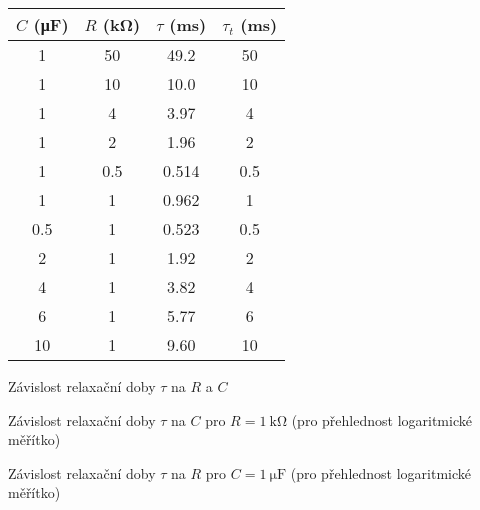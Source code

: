 \begin{tabulka}[htbp]
\centering
\begin{tabular}{c|c|c|c}
$C$ (\si{\micro\farad}) & $R$ (\si{\kilo\ohm}) & $\tau$ (\si{\milli\second}) & $\tau_t$ (\si{\milli\second}) \\ \hline
\num{1} & \num{50} & \num{49.2} & \num{50} \\
\num{1} & \num{10} & \num{10.0} & \num{10} \\
\num{1} & \num{4} & \num{3.97} & \num{4} \\
\num{1} & \num{2} & \num{1.96} & \num{2} \\
\num{1} & \num{0.5} & \num{0.514} & \num{0.5} \\
\num{1} & \num{1} & \num{0.962} & \num{1} \\
\num{0.5} & \num{1} & \num{0.523} & \num{0.5} \\
\num{2} & \num{1} & \num{1.92} & \num{2} \\
\num{4} & \num{1} & \num{3.82} & \num{4} \\
\num{6} & \num{1} & \num{5.77} & \num{6} \\
\num{10} & \num{1} & \num{9.60} & \num{10} \\
\end{tabular}
\caption{Závislost relaxační doby $\tau$ na $R$ a $C$}
\label{t:RC}
\end{tabulka}

\begin{graph}[htbp] 
\centering

\caption{Závislost relaxační doby $\tau$ na $C$ pro $R=\SI{1}{\kilo\ohm}$ (pro přehlednost logaritmické měřítko)}
\label{g:RCr}
\end{graph}

\begin{graph}[htbp] 
\centering

\caption{Závislost relaxační doby $\tau$ na $R$ pro $C=\SI{1}{\micro\farad}$ (pro přehlednost logaritmické měřítko)}
\label{g:RCc}
\end{graph}